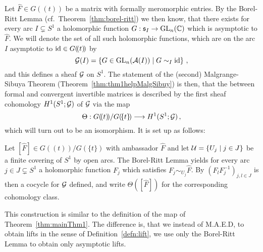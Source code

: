 Let $\hat F\in G(\!(t)\!)$ be a matrix with formally meromorphic entries. By
the Borel-Ritt Lemma (cf.\ Theorem~\ref{thm:borel-ritt}) we then know, that
there exists for every arc $I\subsetneq S^1$ a holomorphic function
$G:\mathfrak{s}_I\to\operatorname{GL}_n(\mathbb{C})$ which is asymptotic to $\hat F$.
We will denote the set of all such holomorphic functions, which are on
the arc $I$ asymptotic to $\operatorname{id}\in G(\!(t)\!)$ by
\[
  \mathcal{G}(I)=\left\{G\in\operatorname{GL}_n(\mathcal{A}(I))\mid G\sim_I\operatorname{id}\right\}\,,
\]
and this defines a sheaf $\mathcal{G}$ on $S^1$.
The statement of the (second) Malgrange-Sibuya Theorem
(Theorem~\ref{thm:thm1helpMalgSibuy}) is then, that the 
between formal and convergent invertible matrices is described by the first
sheaf cohomology $H^1(S^1;\mathcal{G})$ of $\mathcal{G}$ via the map
\[
  \Theta: G(\!(t)\!)/G(\!\{t\}\!)\longrightarrow H^1(S^1;\mathcal{G}) \,,
\]
which will turn out to be an isomorphism. It is set up as follows:
\begin{einr}
  Let $[\hat F]\in G(\!(t)\!)/G(\!\{t\}\!)$ with ambassador $\hat F$ and
  let $\mathcal{U}=\{U_j\mid j\in J\}$ be a finite covering of $S^1$ by open arcs.
  The Borel-Ritt Lemma yields for every arc $j\in J\subsetneq S^1$ a
  holomorphic function $F_j$ which satisfies $F_j\sim_{U_j}\hat F$.
  By $(F_lF_j^{-1})_{j,l\in J}$ is then a cocycle for $\mathcal{G}$ defined,
  and write $\Theta([\hat F])$ for the corresponding cohomology class.
\end{einr}
This construction is similar to the definition of the map of
Theorem~\ref{thm:mainThm1}. The difference is, that we instead of M.A.E.D, to
obtain lifts in the sense of Definition~\ref{defn:lift}, we use only the
Borel-Ritt Lemma to obtain only asymptotic lifts.

